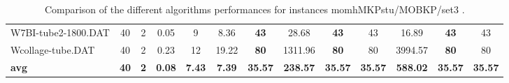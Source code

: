 \begin{table}[h]
{\begin{tabular}{lcccccccccccc}
W7BI-tube2-1800.DAT & 40 & 2 &  \textcolor{blue2}{0.05} & 9 & 8.36 &  \textbf{43} & 28.68 &  \textbf{43} & 43 & 16.89 &  \textbf{43} & 43 \\
Wcollage-tube.DAT & 40 & 2 &  \textcolor{blue2}{0.23} & 12 & 19.22 &  \textbf{80} & 1311.96 &  \textbf{80} & 80 & 3994.57 &  \textbf{80} & 80 \\
\cline{1-13} \textbf{avg} & \textbf{40} & \textbf{2} & \textbf{0.08} & \textbf{7.43} & \textbf{7.39} & \textbf{35.57} & \textbf{238.57} & \textbf{35.57} & \textbf{35.57} & \textbf{588.02} & \textbf{35.57} & \textbf{35.57} \\ \cline{1-13}
\bottomrule
\end{tabular}
}%
\caption{Comparison of the different algorithms performances for instances momhMKPstu/MOBKP/set3 .}
\label{tab:table_compare_momhMKPstu/MOBKP/set3 }
\end{table}

